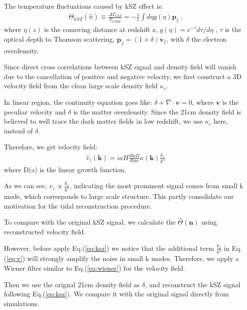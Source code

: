 \indent
The temperature fluctuations caused by kSZ effect is:
\begin{eqnarray}
\label{eq:ksz}
\Theta_{kSZ}(\hat n)\equiv\frac{\Delta T_{kSZ}}{T_{CMB}}
=-\frac{1}{c}\int d\eta g(\eta) \bm{p}_\parallel\ ,
\end{eqnarray}
where $\eta(z)$ is the comoving distance at redshift z, $g(\eta)=e^{-\tau} d\tau/d\eta$ , $\tau$ is the optical depth to Thomson scattering, $\bm{p}_\parallel=(1+\delta)\bm{v}_\parallel$, with $\delta$ the electron overdensity. 

Since direct cross correlations between kSZ signal and density field will vanish due to the cancellation of positive and negative velocity, we first construct a 3D velocity field\cite{Shao11} from the clean large scale density field $\kappa_c$.

In linear region, the continuity equation goes like:
$\dot \delta+\nabla \cdot \bm{v}=0$, 
where $\bm{v}$ is the peculiar velocity and $\delta$ is the matter overdensity. 
Since the 21cm density field is believed to well trace the dark matter fields in low redshift, we use $\kappa_c$ here, instead of $\delta$.

Therefore, we get velocity field:
\begin{eqnarray}
	\label{eq:v}
\hat v_z(\bm{k})=i a H \frac{d\mathrm{ln}D}{d\mathrm{ln}a}\kappa(\bm{k})\frac{k_z}{k^2}\,
\end{eqnarray}
where D(a) is the linear growth function.

As we can see, $v_z \propto \frac{k_z}{k^2}$, indicating the most prominent signal comes from small k mode, which corresponds to large scale structure. This partly consolidate our motivation for the tidal reconstruction procedure.

To compare with the original kSZ signal, we calculate the $\hat\Theta(\bm{n})$ using reconstructed velocity field. 

However, before apply Eq.(\ref{eq:ksz}) we notice that the additional term $\frac{k_z}{k^2}$ in Eq.(\ref{eq:v})
will strongly amplify the noise in small k modes. Therefore, we apply a Wiener filter similar to Eq.(\ref{eq:wiener}) for the velocity field.

Then we use the orignal 21cm density field as $\delta$, 
and reconstruct the kSZ signal following Eq.(\ref{eq:ksz}). 
We compare it with the original signal directly from simulations.


